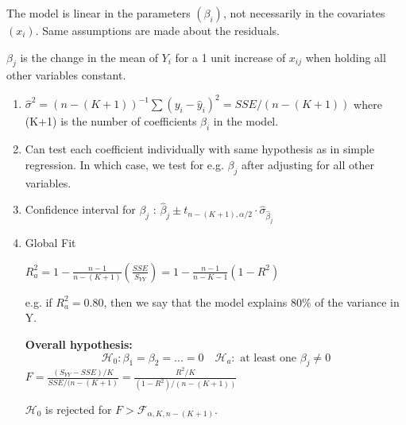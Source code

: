 \documentclass[8pt,landscape]{article}
\begin{document}
\begin{multicols}{3}
The model is linear in the parameters $(\beta_i)$, not necessarily in the covariates $(x_i)$. Same assumptions are made about the residuals. 

$\beta_j$ is the change in the mean of $Y_i$ for a 1 unit increase of $x_{ij}$ when holding all other variables constant.

\begin{enumerate}
\item $\hat{\sigma}^2 = (n - (K+1)) ^{-1} \sum (y_i -\hat{y}_i)^2 = SSE/(n-(K+1))$ where (K+1) is the number of coefficients $\beta_i$ in the model. 
\item Can test each coefficient individually with same hypothesis as in simple regression. In which case, we test for e.g. $\beta_j$ after adjusting for all other variables.
\item Confidence interval for $\beta_j$ : $\hat{\beta}_j \pm t_{n-(K+1), \alpha/2} \cdot \hat{\sigma}_{\hat{\beta}_j}$
\item Global Fit

$R^2_a = 1 - \frac{n-1}{n-(K+1)}\left(\frac{SSE}{S_{YY}}\right) = 1 - \frac{n-1}{n-K-1}(1-R^2) $

e.g. if $R^2_a = 0.80$, then we say that the model explains 80\% of the variance in Y.

\textbf{Overall hypothesis:}
$$\mathcal{H}_0 : \beta_1 = \beta_2 = ... = 0 \quad \mathcal{H}_a : \text{ at least one } \beta_j \neq 0$$
$F = \frac{(S_{YY} - SSE ) /K }{SSE/(n-(K+1)} = \frac{R^2/ K}{(1-R^2)/(n-(K+1))}$

$\mathcal{H}_0$ is rejected for $F> \mathcal{F}_{\alpha, K, n-(K+1)}$.

\end{enumerate}

\end{multicols}
\end{document}
